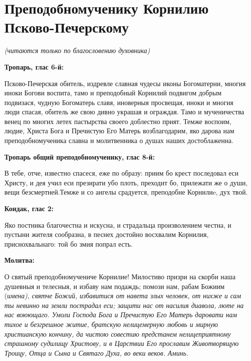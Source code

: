 \section{Преподобномученику Корнилию Псково-Печерскому}
 


\itshape (читаются только по благословению духовника)\normalfont{}


\medskip


\bfseries Тропарь, глас 6-й:\normalfont{}


Псково-Печерская обитель, издревле славная чудесы иконы Богоматерни, многия иноки Богови воспита, тамо и преподобный Корнилий подвигом добрым подвизася, чудную Богоматерь славя, иноверныя просвещая, иноки и многия люди спасая, обитель же свою дивно украшая и ограждая. Тамо и мученичества венец по многих летех пастырства своего доблестно прият. Темже воспоим, людие, Христа Бога и Пречистую Его Матерь возблагодарим, яко дарова нам преподобномученика славна и молитвенника о душах наших достоблаженна.


\medskip


\bfseries Тропарь общий преподобномученику, глас 8-й:\normalfont{}


В тебе, отче, известно спасеся, еже по образу: приим бо крест последовал еси Христу, и дея учил еси презирати убо плоть, преходит бо, прилежати же о души, вещи безсмертней.Темже и со ангелы срадуется, преподобне Корнилиe, дух твой.


\medskip


\bfseries Кондак, глас 2:\normalfont{}


Яко постника благочестна и искусна, и страдальца произволением честна, и пустыни жителя сообразна, в песнех достойно восхвалим Корнилия, приснохвальнаго: той бо змия попрал есть.


\medskip


\bfseries Молитва:\normalfont{}


О святый преподобномучениче Корнилие!  Милостиво призри на скорби наша душевныя и телесныя, и избаву нам подаждь; помози нам, рабам Божиим (\itshape имена\normalfont{}), святче Божий, избавитися от навета злых человек, от нихже и сам ты невинно на земли пострадал еси; защити нас от насилия диавола, люте на нас воюющаго. Умоли Господа Бога и Пречистую Его Матерь даровати нам тихое и безгрешное житие, братскую нелицемерную любовь и мирную христианскую кончину, да чистою совестию предстанем нелицеприятному страшному судилищу Христову, и в Царствии Его прославим Животворящую Троицу, Отца и Сына и Святаго Духа, во веки веков. Аминь.


